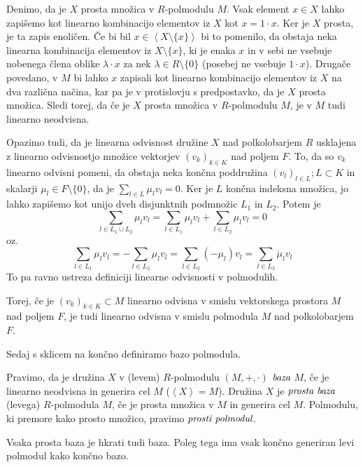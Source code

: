 \documentclass[mat1]{fmfdelo}
\newcommand{\pojem}[1]{\ensuremath{\emph{#1}}}
\newcommand{\Gen}[1]{\ensuremath{\left<{#1}\right>}}
\begin{document}
Denimo, da je $X$ prosta množica v $R$-polmodulu $M$. Vsak element $x\in X$ lahko zapišemo kot linearno kombinacijo elementov iz $X$ kot $x = 1\cdot x$. Ker je $X$ prosta, je ta zapis enoličen. Če bi bil $x \in\Gen{X\setminus\{x\}}$ bi to pomenilo, da obstaja neka linearna kombinacija elementov iz $X\setminus\{x\}$, ki je enaka $x$ in v sebi ne vsebuje nobenega člena oblike $\lambda\cdot x$ za nek $\lambda\in R\setminus\{0\}$ (posebej ne vsebuje $1\cdot x$). Drugače povedano, v $M$ bi lahko $x$ zapisali kot linearno kombinacijo elementov iz $X$ na dva različna načina, kar pa je v protislovju s predpostavko, da je $X$ prosta množica. Sledi torej, da če je $X$ prosta množica v $R$-polmodulu $M$, je v $M$ tudi linearno neodvisna.

Opazimo tudi, da je linearna odvisnost družine $X$ nad polkolobarjem $R$ usklajena z linearno odvisnostjo množice vektorjev $(v_k)_{k\in K}$ nad poljem $F$.
To, da so $v_k$ linearno odvisni pomeni, da obstaja neka končna poddružina $(v_l)_{l\in L}; L\subset K$ in skalarji $\mu_l\in F\setminus\{0\}$, da je $\sum_{l\in L}\mu_lv_l = 0$. Ker je $L$ končna indeksna množica, jo lahko zapišemo kot unijo dveh disjunktnih podmnožic $L_1$ in $L_2$. Potem je $$ \sum_{l\in L_1\cup L_2} \mu_lv_l = \sum_{l\in L_1}\mu_lv_l + \sum_{l\in L_2}\mu_lv_l = 0$$ oz. $$\sum_{l\in L_1}\mu_lv_l = - \sum_{l\in L_2}\mu_lv_l = \sum_{l\in L_2} (-\mu_l)v_l = \sum_{l\in L_2}\acute{\mu}_lv_l $$
To pa ravno ustreza definiciji linearne odvisnosti v polmodulih. 

Torej, če je $(v_k)_{k\in K} \subset M$ linearno odvisna v smislu vektorskega prostora $M$ nad poljem $F$, je tudi linearno odvisna v smislu polmodula $M$ nad polkolobarjem $F$.

Sedaj s sklicem na \cite[Definicija 2.\,4.\,]{bib:Tanbase}končno definiramo bazo polmodula.

\begin{definicija}\label{def:polmodbaza}
	Pravimo, da je družina $X$ v (levem) $R$-polmodulu $(M, +, \cdot)$ \pojem{baza} $M$, če je linearno neodvisna in generira cel $M$ ($\Gen{X} = M$). Družina $X$ je \pojem{prosta baza} (levega) $R$-polmodula $M$, če je prosta množica v $M$ in generira cel $M$. Polmodulu, ki premore kako prosto množico, pravimo \pojem{prosti polmodul}.
\end{definicija}

\begin{opomba}
	Vsaka prosta baza je hkrati tudi baza. Poleg tega ima vsak končno generiran levi polmodul kako končno bazo.
\end{opomba}
\end{document}
